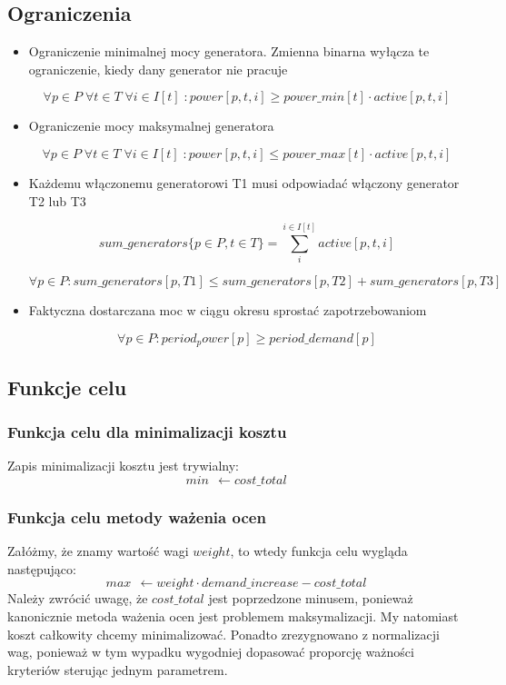 \documentclass[12pt, twoside, hidelinks, a4paper]{article}
\begin{document}
\subsection{Ograniczenia}
\begin{itemize}
\item Ograniczenie minimalnej mocy generatora. Zmienna binarna wyłącza te ograniczenie, kiedy dany generator nie pracuje

$$\forall p \in P \; \forall t \in T \; \forall i \in I[t] \; : power[p,t,i] 
\geqslant power\_min[t] \cdot active[p,t,i]$$
\item Ograniczenie mocy maksymalnej generatora

$$\forall p \in P \; \forall t \in T \; \forall i \in I[t] \; : power[p,t,i] \leqslant power\_max[t] \cdot active[p,t,i]$$
\item Każdemu włączonemu generatorowi T1 musi odpowiadać włączony generator T2 lub T3

$$sum\_generators \{ p \in P, t \in T \} = \sum_{i}^{i \in I[t]} active[p,t,i]$$

$$\forall p \in P : sum\_generators[p,T1] \leqslant sum\_generators[p,T2] + sum\_generators[p,T3]$$
\item Faktyczna dostarczana moc w ciągu okresu sprostać zapotrzebowaniom

$$\forall p \in P : period_power[p] \geqslant period\_demand[p]$$
\end{itemize}

\subsection{Funkcje celu}
\subsubsection{Funkcja celu dla minimalizacji kosztu}
Zapis minimalizacji kosztu jest trywialny:
$$min \: \: \leftarrow cost\_total$$

\subsubsection{Funkcja celu metody ważenia ocen}
Załóżmy, że znamy wartość wagi $weight$, to wtedy funkcja celu wygląda następująco:
$$max \: \: \leftarrow weight \cdot demand\_increase - cost\_total$$
Należy zwrócić uwagę, że $cost\_total$ jest poprzedzone minusem, ponieważ kanonicznie metoda ważenia ocen jest problemem maksymalizacji. My natomiast koszt całkowity chcemy minimalizować. Ponadto zrezygnowano z normalizacji wag, ponieważ w tym wypadku wygodniej dopasować proporcję ważności kryteriów sterując jednym parametrem.
\end{document}
